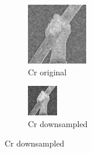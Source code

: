 \begin{figure}[H]
    \centering
    \begin{subfigure}[t]{0.4\textwidth}
        \centering
        \includegraphics[width=\linewidth]{src/assets/tests/Cr_zoom.png}
        \caption{Cr original}
        \label{fig:tests-Cr-original}
    \end{subfigure}
    \hfill
    \begin{subfigure}[t]{0.4\textwidth}
        \centering
        \includegraphics[width=\linewidth]{src/assets/tests/Cr_downsampled_zoom.png}
        \caption{Cr downsampled}
        \label{fig:tests-Cr-downsampled}
    \end{subfigure}


\end{figure}
